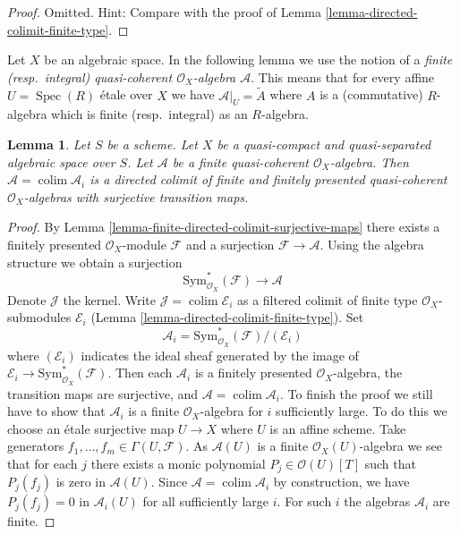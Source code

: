 \documentclass{stacks-project}
\theoremstyle{plain}
\newtheorem{lemma}[subsection]{Lemma}
\theoremstyle{definition}
\theoremstyle{remark}
\numberwithin{equation}{subsection}
\def\colim{\mathop{\mathrm{colim}}\nolimits}
\def\Spec{\mathop{\mathrm{Spec}}}
\begin{document}
\begin{proof}
Omitted. Hint: Compare with the proof of
Lemma \ref{lemma-directed-colimit-finite-type}.
\end{proof}

\noindent
Let $X$ be an algebraic space. In the following lemma we use the notion
of a {\it finite (resp.\ integral) quasi-coherent
$\mathcal{O}_X$-algebra $\mathcal{A}$}. This means that for every
affine $U = \Spec(R)$ \'etale over $X$ we have
$\mathcal{A}|_U = \widetilde{A}$ where $A$ is a (commutative) $R$-algebra
which is finite (resp.\ integral) as an $R$-algebra.

\begin{lemma}
\label{lemma-finite-algebra-directed-colimit-finite-finitely-presented}
Let $S$ be a scheme. Let $X$ be a quasi-compact and quasi-separated
algebraic space over $S$. Let $\mathcal{A}$ be a finite quasi-coherent
$\mathcal{O}_X$-algebra. Then $\mathcal{A} = \colim \mathcal{A}_i$
is a directed colimit of finite and finitely presented quasi-coherent
$\mathcal{O}_X$-algebras with surjective transition maps.
\end{lemma}

\begin{proof}
By Lemma \ref{lemma-finite-directed-colimit-surjective-maps}
there exists a finitely presented $\mathcal{O}_X$-module
$\mathcal{F}$ and a surjection $\mathcal{F} \to \mathcal{A}$.
Using the algebra structure we obtain a surjection
$$
\text{Sym}^*_{\mathcal{O}_X}(\mathcal{F}) \longrightarrow \mathcal{A}
$$
Denote $\mathcal{J}$ the kernel. Write $\mathcal{J} = \colim \mathcal{E}_i$
as a filtered colimit of finite type $\mathcal{O}_X$-submodules
$\mathcal{E}_i$ (Lemma \ref{lemma-directed-colimit-finite-type}). Set
$$
\mathcal{A}_i = \text{Sym}^*_{\mathcal{O}_X}(\mathcal{F})/(\mathcal{E}_i)
$$
where $(\mathcal{E}_i)$ indicates the ideal sheaf generated by
the image of $\mathcal{E}_i \to \text{Sym}^*_{\mathcal{O}_X}(\mathcal{F})$.
Then each $\mathcal{A}_i$ is a finitely presented $\mathcal{O}_X$-algebra,
the transition maps are surjective, and $\mathcal{A} = \colim \mathcal{A}_i$.
To finish the proof we still
have to show that $\mathcal{A}_i$ is a finite $\mathcal{O}_X$-algebra
for $i$ sufficiently large. To do this we choose an \'etale surjective
map $U \to X$ where $U$ is an affine scheme. Take generators
$f_1, \ldots, f_m \in \Gamma(U, \mathcal{F})$.
As $\mathcal{A}(U)$ is a finite $\mathcal{O}_X(U)$-algebra we
see that for each $j$ there exists a monic polynomial
$P_j \in \mathcal{O}(U)[T]$ such that $P_j(f_j)$ is zero in $\mathcal{A}(U)$.
Since $\mathcal{A} = \colim \mathcal{A}_i$ by construction, we
have $P_j(f_j) = 0$ in $\mathcal{A}_i(U)$ for all sufficiently large $i$.
For such $i$ the algebras $\mathcal{A}_i$ are finite.
\end{proof}
\end{document}
